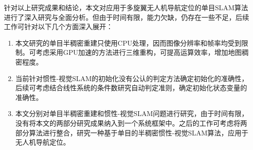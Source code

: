 \begin{conclusion}
针对以上研究成果和结论，本文对应用于多旋翼无人机导航定位的单目SLAM算法进行了深入研究与全面分析。但由于时间有限，能力欠缺，仍存在一些不足，后续工作可针对以下几个方面深入展开：
\begin{enumerate}  [label={(\arabic*)}]
\item 本文研究的单目半稠密重建只使用CPU处理，因而图像分辨率和帧率均受到限制。可考虑采用GPU加速的方法进行三维重构，可提高运算效率，增加地图稠密程度。
\item 当前针对惯性-视觉SLAM的初始化没有公认的判定方法确定初始化的准确性，后续可考虑结合线性系统的条件数研究自动判定准则，确定初始化状态变量的准确性。
\item 本文分别对单目半稠密重建和惯性-视觉SLAM问题进行研究，由于时间有限，没有将本文的两部分研究成果纳入到一个系统框架中。之后的工作可考虑将两部分算法进行整合，研究一种基于单目的半稠密惯性-视觉SLAM算法，应用于无人机导航定位。
\end{enumerate}





\end{conclusion}